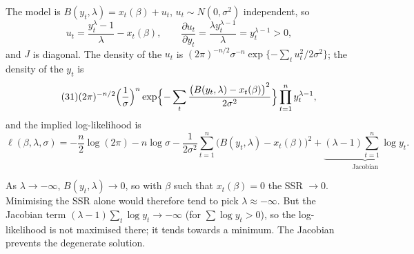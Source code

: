 \documentclass[11pt]{article}
\begin{document}
The model is $B(y_{t},\lambda)=x_{t}(\beta)+u_{t}$, $u_{t}\sim N(0,\sigma^{2})$ independent, so
\[ u_{t}=\frac{y_{t}^{\lambda}-1}{\lambda}-x_{t}(\beta), \qquad
   \frac{\partial u_{t}}{\partial y_{t}}=\frac{\lambda y_{t}^{\lambda-1}}{\lambda}=y_{t}^{\lambda-1}>0, \]
and $J$ is diagonal. The density of the $u_{t}$ is
$(2\pi)^{-n/2}\sigma^{-n}\exp\{-\sum_{t}u_{t}^{2}/2\sigma^{2}\}$; the density of the $y_{t}$ is
\begin{equation}\tag{31}
 (2\pi)^{-n/2}\Bigl(\frac1\sigma\Bigr)^{n}
 \exp\Bigl\{-\sum_{t}\frac{\bigl(B(y_{t},\lambda)-x_{t}(\beta)\bigr)^{2}}{2\sigma^{2}}\Bigr\}
 \prod_{t=1}^{n}y_{t}^{\lambda-1},
\end{equation}
and the implied log-likelihood is
\[ \ell(\beta,\lambda,\sigma)=-\frac n2\log(2\pi)-n\log\sigma
   -\frac1{2\sigma^{2}}\sum_{t=1}^{n}\bigl(B(y_{t},\lambda)-x_{t}(\beta)\bigr)^{2}
   +\underbrace{(\lambda-1)\sum_{t=1}^{n}\log y_{t}}_{\text{Jacobian}} . \]

As $\lambda\to-\infty$, $B(y_{t},\lambda)\to0$, so with $\beta$ such that $x_{t}(\beta)=0$ the SSR $\to0$. Minimising
the SSR alone would therefore tend to pick $\lambda\approx-\infty$. But the Jacobian term
$(\lambda-1)\sum_{t}\log y_{t}\to-\infty$ (for $\sum\log y_{t}>0$), so the log-likelihood is not maximised
there; it tends towards a minimum. The Jacobian prevents the degenerate solution.
\end{document}
